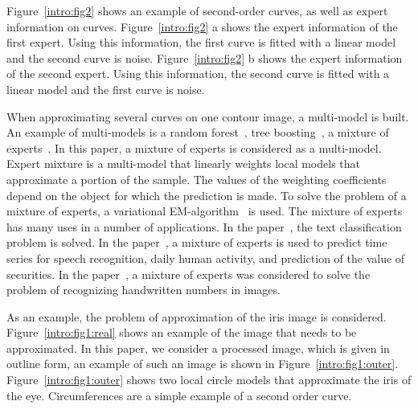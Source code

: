 \documentclass[12pt, twoside]{article}
\numberwithin{equation}{section}
\begin{document}
Figure~\ref{intro:fig2} shows an example of second-order curves, as well as expert information on curves. Figure~\ref{intro:fig2} a shows the expert information of the first expert. Using this information, the first curve is fitted with a linear model and the second curve is noise. Figure~\ref{intro:fig2} b shows the expert information of the second expert. Using this information, the second curve is fitted with a linear model and the first curve is noise.

When approximating several curves on one contour image, a multi-model is built. An example of multi-models is a random forest~\cite{Ishwaran2012}, tree boosting~\cite{Tianqi2016}, a mixture of experts~\cite{Yuksel2012}. In this paper, a mixture of experts is considered as a multi-model. Expert mixture is a multi-model that linearly weights local models that approximate a portion of the sample. The values of the weighting coefficients depend on the object for which the prediction is made. To solve the problem of a mixture of experts, a variational EM-algorithm~\cite{Dempster1977, bishop2006, Peng1996} is used. The mixture of experts has many uses in a number of applications. In the paper~\cite{Estabrooks2001}, the text classification problem is solved. In the paper~\cite{Cheung1995, Weigend2000, Cao2003, Mossavat2010, Sminchisescu2007, Tuerk2001, Yumlu2003}, a mixture of experts is used to predict time series for speech recognition, daily human activity, and prediction of the value of securities. In the paper~\cite{Ebrahimpour2009}, a mixture of experts was considered to solve the problem of recognizing handwritten numbers in images.

As an example, the problem of approximation of the iris image is considered. Figure~\ref{intro:fig1:real} shows an example of the image that needs to be approximated. In this paper, we consider a processed image, which is given in outline form, an example of such an image is shown in Figure~\ref{intro:fig1:outer}. Figure~\ref{intro:fig1:outer} shows two local circle models that approximate the iris of the eye. Circumferences are a simple example of a second order curve.
\end{document}
